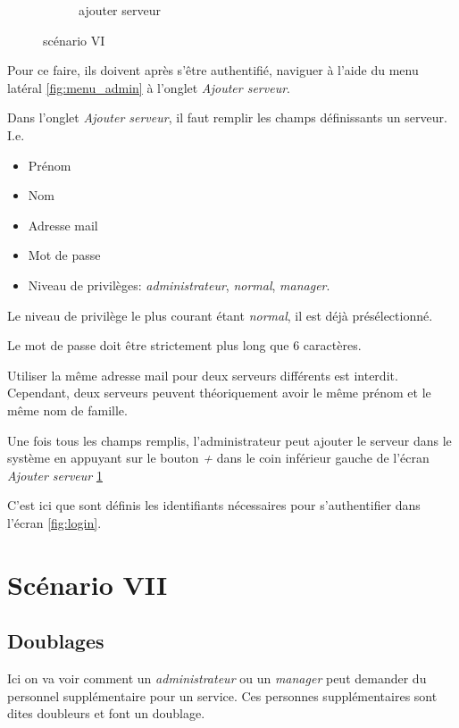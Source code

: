 \begin{figure}[!h]
\begin{subfigure}{.45\textwidth}
            \caption{ajouter serveur}
            \label{fig:ajout_serveur}
        \end{subfigure}
        \caption{scénario VI}
        \label{fig:scen06}
    \end{figure}

    Pour ce faire, ils doivent après s'être authentifié, naviguer à l'aide 
    du menu latéral \ref{fig:menu_admin} à l'onglet \textit{Ajouter serveur}.

    Dans l'onglet \textit{Ajouter serveur}, il faut remplir les champs définissants un serveur. I.e. 
    \smallskip
    \begin{itemize}
        \item Prénom
        \item Nom 
        \item Adresse mail
        \item Mot de passe
        \item Niveau de privilèges: \textit{administrateur}, \textit{normal}, \textit{manager}. 
    \end{itemize}
    \medskip
    Le niveau de privilège le plus courant étant \textit{normal}, il est déjà 
    présélectionné.

    Le mot de passe doit être strictement plus long que 6 caractères.

    Utiliser la même adresse mail pour deux serveurs différents est interdit. 
    Cependant, deux serveurs peuvent théoriquement avoir le même prénom et le même nom de 
    famille.

    Une fois tous les champs remplis, l'administrateur peut ajouter le serveur
    dans le système en appuyant sur le bouton \textit{+} dans le coin inférieur
    gauche de l'écran \textit{Ajouter serveur} \ref{fig:ajout_serveur}

    C'est ici que sont définis les identifiants nécessaires pour s'authentifier dans l'écran \ref{fig:login}.
    \section[Doublages - Scénario VII]{Scénario VII}
        \subsection*{Doublages}
        Ici on va voir comment un \textit{administrateur} ou un \textit{manager} peut demander
        du personnel supplémentaire pour un service. Ces personnes supplémentaires sont dites 
        doubleurs et font un doublage.

